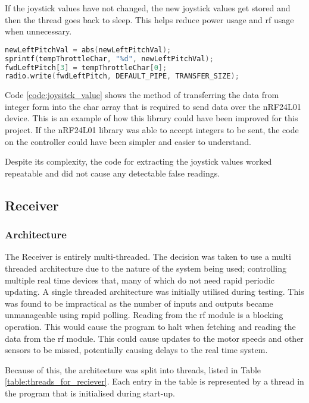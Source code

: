 \documentclass [12pt]{article}
\begin{document}
If the joystick values have not changed, the new joystick values get stored and then the thread goes back to sleep. This helps reduce power usage and \gls{rf} usage when unnecessary.

\begin{lstlisting}[language=C++,label=code:joysitck_value,caption= Joystick Value to Serial Data to be Sent]
newLeftPitchVal = abs(newLeftPitchVal);
sprintf(tempThrottleChar, "%d", newLeftPitchVal);
fwdLeftPitch[3] = tempThrottleChar[0];
radio.write(fwdLeftPitch, DEFAULT_PIPE, TRANSFER_SIZE);  
\end{lstlisting}

Code \ref{code:joysitck_value} shows the method of transferring the data from integer form into the char array that is required to send data over the nRF24L01 device. This is an example of how this library could have been improved for this project. If the nRF24L01 library was able to accept integers to be sent, the code on the controller could have been simpler and easier to understand. 

Despite its complexity, the code for extracting the joystick values worked repeatable and did not cause any detectable false readings.
                

\subsection{Receiver}
\subsubsection{Architecture}

The Receiver is entirely multi-threaded. The decision was taken to use a multi threaded architecture due to the nature of the system being used; controlling multiple real time devices that, many of which do not need rapid periodic updating. A single threaded architecture was initially utilised during testing. This was found to be impractical as the number of inputs and outputs became unmanageable using rapid polling. Reading from the \gls{rf} module is a blocking operation. This would cause the program to halt when fetching and reading the data from the \gls{rf} module. This could cause updates to the motor speeds and other sensors to be missed, potentially causing delays to the real time system. 

Because of this, the architecture was split into threads, listed in Table \ref{table:threads_for_reciever}. Each entry in the table is represented by a thread in the program that is initialised during start-up.
\end{document}
